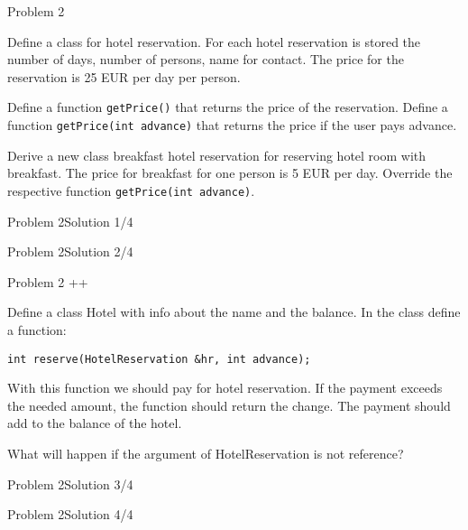 \begin{frame}{Problem 2}
\begin{scriptsize}
Define a class for hotel reservation. For each hotel reservation is stored the
number of days, number of persons, name for contact. The price for the
reservation is 25 EUR per day per person.

Define a function \texttt{getPrice()} that returns the price of the reservation.
Define a function \texttt{getPrice(int advance)} that returns the price if the
user pays advance.

Derive a new class breakfast hotel reservation for reserving hotel room with
breakfast. The price for breakfast for one person is 5 EUR per day. Override the
respective function \texttt{getPrice(int advance)}. 

\end{scriptsize}
 
\end{frame}

\begin{frame}[fragile]{Problem 2}{Solution 1/4}

\end{frame}

\begin{frame}[fragile]{Problem 2}{Solution 2/4}

\end{frame}

\begin{frame}[fragile]{Problem 2 ++}
\begin{scriptsize}
Define a class Hotel with info about the name and the balance. In the class
define a function:

\texttt{int reserve(HotelReservation &hr, int advance);}

With this function we should pay for hotel reservation. If the payment exceeds
the needed amount, the function should return the change. The payment should add
to the balance of the hotel.

What will happen if the argument of HotelReservation is not reference?

\end{scriptsize}
\end{frame}


\begin{frame}[fragile]{Problem 2}{Solution 3/4}

\end{frame}

\begin{frame}[fragile]{Problem 2}{Solution 4/4}

\end{frame}

